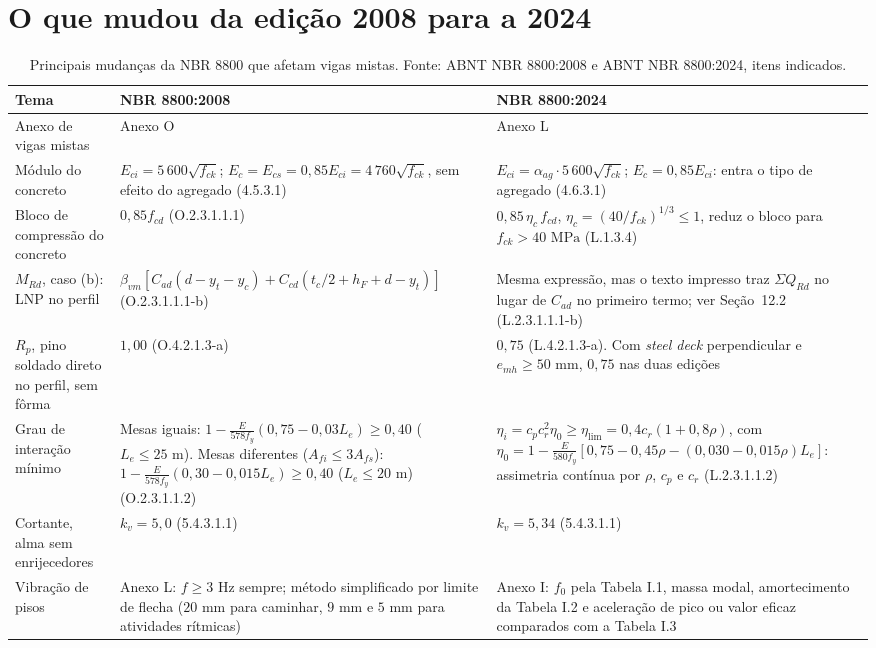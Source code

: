 \documentclass[11pt,a4paper]{article}
\begin{document}
\section{O que mudou da edição 2008 para a 2024}

\begin{table}[!htbp]
  \centering
  \caption{Principais mudanças da NBR 8800 que afetam vigas mistas. Fonte: ABNT NBR 8800:2008 e ABNT NBR 8800:2024, itens indicados.}
  \label{tab:mudancas-2024}
  \footnotesize
  \begin{tabularx}{\linewidth}{lXX}
    \toprule
    \textbf{Tema} & \textbf{NBR 8800:2008} & \textbf{NBR 8800:2024} \\
    \midrule
    Anexo de vigas mistas & Anexo O & Anexo L \\
    \addlinespace
    Módulo do concreto & $E_{ci} = 5\,600\sqrt{f_{ck}}$; $E_c = E_{cs} = 0{,}85 E_{ci} = 4\,760\sqrt{f_{ck}}$, sem efeito do agregado (4.5.3.1) & $E_{ci} = \alpha_{ag}\cdot 5\,600\sqrt{f_{ck}}$; $E_c = 0{,}85 E_{ci}$: entra o tipo de agregado (4.6.3.1) \\
    \addlinespace
    Bloco de compressão do concreto & $0{,}85 f_{cd}$ (O.2.3.1.1.1) & $0{,}85\,\eta_c\,f_{cd}$, $\eta_c = (40/f_{ck})^{1/3} \le 1$, reduz o bloco para $f_{ck} > 40\text{ MPa}$ (L.1.3.4) \\
    \addlinespace
    $M_{Rd}$, caso (b): LNP no perfil & $\beta_{vm}[C_{ad}(d - y_t - y_c) + C_{cd}(t_c/2 + h_F + d - y_t)]$ (O.2.3.1.1.1-b) & Mesma expressão, mas o texto impresso traz $\Sigma Q_{Rd}$ no lugar de $C_{ad}$ no primeiro termo; ver Seção~12.2 (L.2.3.1.1.1-b) \\
    \addlinespace
    $R_p$, pino soldado direto no perfil, sem fôrma & $1{,}00$ (O.4.2.1.3-a) & $0{,}75$ (L.4.2.1.3-a). Com \textit{steel deck} perpendicular e $e_{mh} \ge 50\text{ mm}$, $0{,}75$ nas duas edições \\
    \addlinespace
    Grau de interação mínimo & Mesas iguais: $1 - \frac{E}{578 f_y}(0{,}75 - 0{,}03 L_e) \ge 0{,}40$ ($L_e \le 25\text{ m}$). Mesas diferentes ($A_{fi} \le 3 A_{fs}$): $1 - \frac{E}{578 f_y}(0{,}30 - 0{,}015 L_e) \ge 0{,}40$ ($L_e \le 20\text{ m}$) (O.2.3.1.1.2) & $\eta_i = c_p c_r^2 \eta_0 \ge \eta_{\text{lim}} = 0{,}4 c_r(1 + 0{,}8\rho)$, com $\eta_0 = 1 - \frac{E}{580 f_y}[0{,}75 - 0{,}45\rho - (0{,}030 - 0{,}015\rho)L_e]$: assimetria contínua por $\rho$, $c_p$ e $c_r$ (L.2.3.1.1.2) \\
    \addlinespace
    Cortante, alma sem enrijecedores & $k_v = 5{,}0$ (5.4.3.1.1) & $k_v = 5{,}34$ (5.4.3.1.1) \\
    \addlinespace
    Vibração de pisos & Anexo L: $f \ge 3\text{ Hz}$ sempre; método simplificado por limite de flecha ($20\text{ mm}$ para caminhar, $9\text{ mm}$ e $5\text{ mm}$ para atividades rítmicas) & Anexo I: $f_0$ pela Tabela I.1, massa modal, amortecimento da Tabela I.2 e aceleração de pico ou valor eficaz comparados com a Tabela I.3 \\
    \bottomrule
  \end{tabularx}
\end{table}
\end{document}

